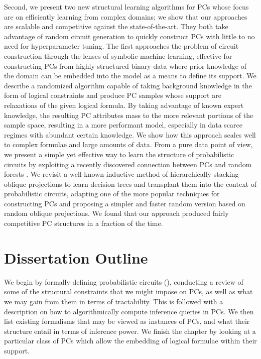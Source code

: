 Second, we present two new structural learning algorithms for PCs whose focus are on efficiently
learning from complex domains; we show that our approaches are scalable and competitive against the
state-of-the-art. They both take advantage of random circuit generation to quickly construct PCs
with little to no need for hyperparameter tuning. The first approaches the problem of circuit
construction through the lenses of symbolic machine learning, effective for constructing PCs from
highly structured binary data where prior knowledge of the domain can be embedded into the model as
a means to define its support. We describe a randomized algorithm capable of taking background
knowledge in the form of logical constraints and produce PC samples whose support are relaxations
of the given logical formula. By taking advantage of known expert knowledge, the resulting PC
attributes mass to the more relevant portions of the sample space, resulting in a more performant
model, especially in data scarce regimes with abundant certain knowledge. We show how this approach
scales well to complex formulae and large amounts of data. From a pure data point of view, we
present a simple yet effective way to learn the structure of probabilistic circuits by exploiting a
recently discovered connection between PCs and random forests \citep{correia20}. We revisit a
well-known inductive method of hierarchically stacking oblique projections to learn decision trees
\citep{dasgupta08a,dasgupta08b} and transplant them into the context of probabilistic circuits,
adapting one of the more popular techniques for constructing PCs and proposing a simpler and faster
random version based on random oblique projections. We found that our approach produced fairly
competitive PC structures in a fraction of the time.

\section{Dissertation Outline}

We begin  by formally defining probabilistic circuits (), conducting a
review of some of the structural constraints that we might impose on PCs, as well as what we may
gain from them in terms of tractability. This is followed with a description on how to
algorithmically compute inference queries in PCs. We then list existing formalisms that may be
viewed as instances of PCs, and what their structure entail in terms of inference power. We finish
the chapter by looking at a particular class of PCs which allow the embedding of logical formulae
within their support.

